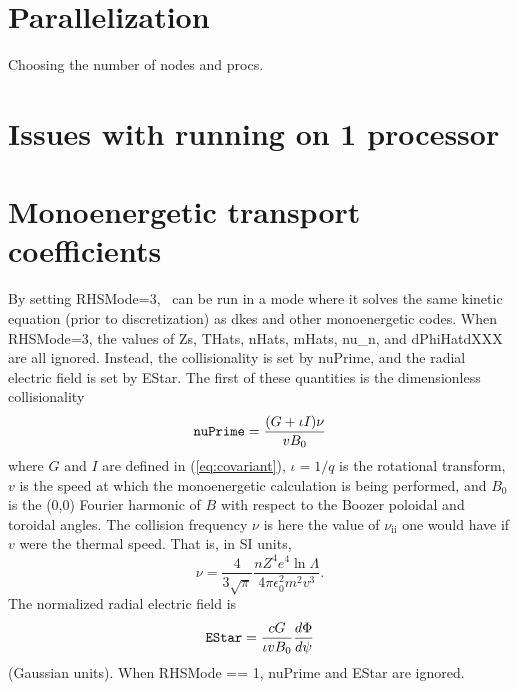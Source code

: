 \section{Parallelization}
Choosing the number of nodes and procs.

\section{Issues with running on 1 processor}

\section{Monoenergetic transport coefficients}
\label{sec:monoenergetic}

By setting {\ttfamily RHSMode=3}, \sfincs~can be run in a mode
where it solves the same kinetic equation (prior to discretization) as {\ttfamily dkes}
and other monoenergetic codes.
When {\ttfamily RHSMode=3}, the values of {\ttfamily Zs}, {\ttfamily THats}, {\ttfamily nHats},
{\ttfamily mHats}, {\ttfamily nu\_n}, and {\ttfamily dPhiHatdXXX} are all ignored.
Instead, the collisionality is set by {\ttfamily nuPrime}, and the radial electric field is set
by {\ttfamily EStar}.  The first of these quantities is the dimensionless collisionality
\begin{equation}
\mbox{\ttfamily nuPrime} = \frac{(G+\iota I) \nu}{v B_0}
\end{equation}
where $G$ and $I$ are defined in (\ref{eq:covariant}), $\iota=1/q$ is the rotational transform,
$v$ is the speed at which the monoenergetic calculation is being performed, and $B_0$ is the (0,0) Fourier harmonic of $B$
with respect to the Boozer poloidal and toroidal angles. The collision
frequency $\nu$ is here the value of $\nu_\mathrm{ii}$ one would have if
$v$ were the thermal speed. That is, in SI units,
\begin{equation}
  \nu=\frac{4}{3\sqrt{\pi}}\frac{n Z^4e^4\ln \Lambda}{4\pi\epsilon_0^2m^2v^3}.
\end{equation}
%
The normalized radial electric field is
\begin{equation}
\mbox{\ttfamily EStar} = \frac{cG}{\iota v B_0} \frac{d\Phi}{d\psi}
\end{equation}
(Gaussian units).
When {\ttfamily RHSMode} == 1, {\ttfamily nuPrime} and {\ttfamily EStar} are ignored.


